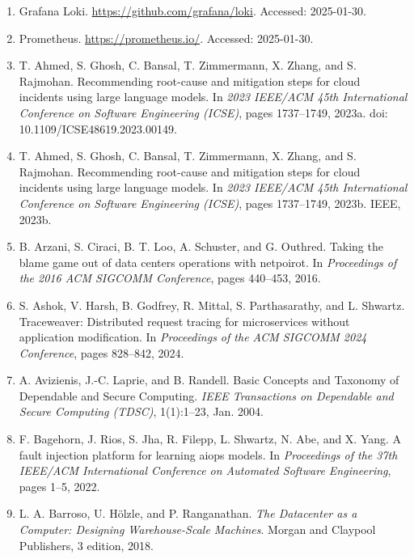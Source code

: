 \documentclass[10pt,UTF8,fontset=fandol]{ctexart}
\begin{document}
\begin{enumerate}[leftmargin=2em,itemsep=2pt]
\item Grafana Loki. \url{https://github.com/grafana/loki}. Accessed: 2025-01-30.

\item Prometheus. \url{https://prometheus.io/}. Accessed: 2025-01-30.

\item T. Ahmed, S. Ghosh, C. Bansal, T. Zimmermann, X. Zhang, and S. Rajmohan. Recommending root-cause and mitigation steps for cloud incidents using large language models. In \textit{2023 IEEE/ACM 45th International Conference on Software Engineering (ICSE)}, pages 1737--1749, 2023a. doi: 10.1109/ICSE48619.2023.00149.

\item T. Ahmed, S. Ghosh, C. Bansal, T. Zimmermann, X. Zhang, and S. Rajmohan. Recommending root-cause and mitigation steps for cloud incidents using large language models. In \textit{2023 IEEE/ACM 45th International Conference on Software Engineering (ICSE)}, pages 1737--1749, 2023b. IEEE, 2023b.

\item B. Arzani, S. Ciraci, B. T. Loo, A. Schuster, and G. Outhred. Taking the blame game out of data centers operations with netpoirot. In \textit{Proceedings of the 2016 ACM SIGCOMM Conference}, pages 440--453, 2016.

\item S. Ashok, V. Harsh, B. Godfrey, R. Mittal, S. Parthasarathy, and L. Shwartz. Traceweaver: Distributed request tracing for microservices without application modification. In \textit{Proceedings of the ACM SIGCOMM 2024 Conference}, pages 828--842, 2024.

\item A. Avizienis, J.-C. Laprie, and B. Randell. Basic Concepts and Taxonomy of Dependable and Secure Computing. \textit{IEEE Transactions on Dependable and Secure Computing (TDSC)}, 1(1):1--23, Jan. 2004.

\item F. Bagehorn, J. Rios, S. Jha, R. Filepp, L. Shwartz, N. Abe, and X. Yang. A fault injection platform for learning aiops models. In \textit{Proceedings of the 37th IEEE/ACM International Conference on Automated Software Engineering}, pages 1--5, 2022.

\item L. A. Barroso, U. H\"olzle, and P. Ranganathan. \textit{The Datacenter as a Computer: Designing Warehouse-Scale Machines}. Morgan and Claypool Publishers, 3 edition, 2018.


\end{enumerate}
\end{document}
